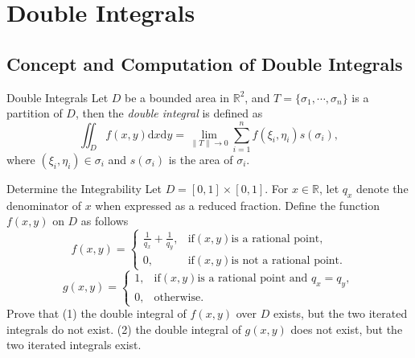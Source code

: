 \section{Double Integrals}

\subsection{Concept and Computation of Double Integrals}

\begin{definition}{Double Integrals}{}
  Let $D$ be a bounded area in $\mathbb{R}^2$,
  and $T = \{\sigma_1,\cdots,\sigma_n\}$ is a partition of $D$,
  then the \emph{double integral} is defined as
  \begin{equation}
    \iint_D f(x,y)\mathrm{d}x \mathrm{d}y = \lim \limits _{\|T\|\rightarrow 0} \sum\limits_{i = 1}^n f(\xi_i, \eta_i) s(\sigma_i),
  \end{equation}
  where $(\xi_i, \eta_i) \in \sigma_i$ and $s(\sigma_i)$ is the area of $\sigma_i$.
\end{definition}

\begin{example}{Determine the Integrability}{}
  Let $D = [0, 1]\times [0,1]$. For $x \in \mathbb{R}$,
  let $q_x$ denote the denominator of $x$ when expressed as a reduced fraction.
  Define the function $f(x,y)$ on $D$ as follows
  \begin{equation}
    f(x,y)=\begin{cases}
      \frac{1}{q_x}+\frac{1}{q_y},&\mathrm{if}\left(x,y\right)\text{is a rational point},\\
      0,&\mathrm{if}\left(x,y\right)\text{is not a rational point}.
    \end{cases}
  \end{equation}
  \begin{equation}
    g(x,y)=\begin{cases}
      1,&\mathrm{if}(x,y)\text{is a rational point and }q_x=q_y,\\
      0,&\text{otherwise.}
    \end{cases}
  \end{equation}
  Prove that (1) the double integral of $f(x,y)$ over $D$ exists, but the two
  iterated integrals do not exist.
  (2) the double integral of $g(x,y)$ does not exist, but the two iterated
  integrals exist.
\end{example}

